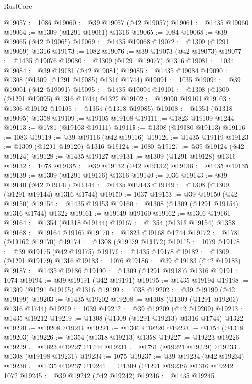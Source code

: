 \begin{lexlean}{RustCore}
\begin{coremodule}
@19057 := 1086
@19060 := @39 @19057 (@42 @19057)
@19061 := @1435 @19060
@19064 := @1309 (@1291 @19061) @1316
@19065 := 1084
@19068 := @39 @19065 (@42 @19065)
@19069 := @1435 @19068
@19072 := @1309 (@1291 @19069) @1316
@19073 := 1082
@19076 := @39 @19073 (@42 @19073)
@19077 := @1435 @19076
@19080 := @1309 (@1291 @19077) @1316
@19081 := 1034
@19084 := @39 @19081 (@42 @19081)
@19085 := @1435 @19084
@19090 := @1308 (@1309 (@1291 @19085) @1316 @1744)
@19091 := 1035
@19094 := @39 @19091 (@42 @19091)
@19095 := @1435 @19094
@19101 := @1308 (@1309 (@1291 @19095) @1316 @1744) @1322
@19102 := @19090 @19101
@19103 := @1306 @19102
@19105 := @1354 (@1318 @19085)
@19108 := @1354 (@1318 @19095) @1358
@19109 := @19105 @19108
@19111 := @1823 @19109 @1244
@19113 := @1781 (@19103 @19111)
@19115 := @1308 (@19080 @19113)
@19116 := 1083
@19119 := @39 @19116 (@42 @19116)
@19120 := @1435 @19119
@19123 := @1309 (@1291 @19120) @1316
@19124 := 1080
@19127 := @39 @19124 (@42 @19124)
@19128 := @1435 @19127
@19131 := @1309 (@1291 @19128) @1316
@19132 := 1078
@19135 := @39 @19132 (@42 @19132)
@19136 := @1435 @19135
@19139 := @1309 (@1291 @19136) @1316
@19140 := 1036
@19143 := @39 @19140 (@42 @19140)
@19144 := @1435 @19143
@19149 := @1308 (@1309 (@1291 @19144) @1316 @1744)
@19150 := 1037
@19153 := @39 @19150 (@42 @19150)
@19154 := @1435 @19153
@19160 := @1308 (@1309 (@1291 @19154) @1316 @1744) @1322
@19161 := @19149 @19160
@19162 := @1306 @19161
@19164 := @1354 (@1318 @19144)
@19167 := @1354 (@1318 @19154) @1358
@19168 := @19164 @19167
@19170 := @1823 @19168 @1244
@19172 := @1781 (@19162 @19170)
@19174 := @1308 (@19139 @19172)
@19175 := 1079
@19178 := @39 @19175 (@42 @19175)
@19179 := @1435 @19178
@19182 := @1309 (@1291 @19179) @1316
@19183 := 1076
@19186 := @39 @19183 (@42 @19183)
@19187 := @1435 @19186
@19190 := @1309 (@1291 @19187) @1316
@19191 := 1074
@19194 := @39 @19191 (@42 @19191)
@19195 := @1435 @19194
@19198 := @1309 (@1291 @19195) @1316
@19199 := 1038
@19202 := @39 @19199 (@42 @19199)
@19203 := @1435 @19202
@19208 := @1308 (@1309 (@1291 @19203) @1316 @1744)
@19209 := 1039
@19212 := @39 @19209 (@42 @19209)
@19213 := @1435 @19212
@19219 := @1308 (@1309 (@1291 @19213) @1316 @1744) @1322
@19220 := @19208 @19219
@19221 := @1306 @19220
@19223 := @1354 (@1318 @19203)
@19226 := @1354 (@1318 @19213) @1358
@19227 := @19223 @19226
@19229 := @1823 @19227 @1244
@19231 := @1781 (@19221 @19229)
@19233 := @1308 (@19198 @19231)
@19234 := 1075
@19237 := @39 @19234 (@42 @19234)
@19238 := @1435 @19237
@19241 := @1309 (@1291 @19238) @1316
@19242 := 1072
@19245 := @39 @19242 (@42 @19242)
@19246 := @1435 @19245

\end{coremodule}
\end{lexlean}
